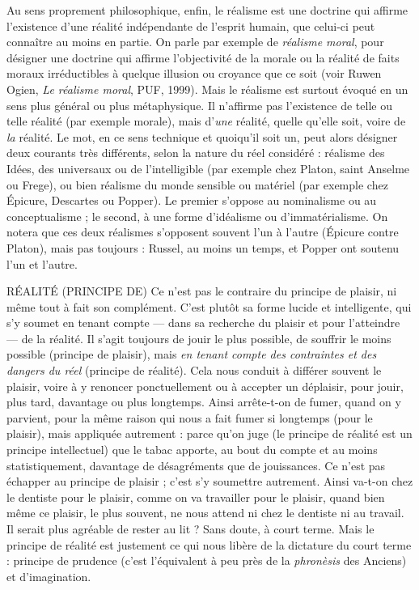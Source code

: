 Au sens proprement philosophique, enfin, le réalisme est une doctrine qui
affirme l'existence d’une réalité indépendante de l’esprit humain, que celui-ci
peut connaître au moins en partie. On parle par exemple de {\it réalisme moral},
pour désigner une doctrine qui affirme l’objectivité de la morale ou la réalité de
faits moraux irréductibles à quelque illusion ou croyance que ce soit (voir
Ruwen Ogien, {\it Le réalisme moral}, PUF, 1999). Mais le réalisme est surtout
évoqué en un sens plus général ou plus métaphysique. Il n’affirme pas l’existence
de telle ou telle réalité (par exemple morale), mais d’{\it une} réalité, quelle
qu’elle soit, voire de {\it la} réalité. Le mot, en ce sens technique et quoiqu'il soit un,
peut alors désigner deux courants très différents, selon la nature du réel
considéré : réalisme des Idées, des universaux ou de l’intelligible (par exemple
chez Platon, saint Anselme ou Frege), ou bien réalisme du monde sensible ou
matériel (par exemple chez Épicure, Descartes ou Popper). Le premier s'oppose
au nominalisme ou au conceptualisme ; le second, à une forme d’idéalisme ou
d’immatérialisme. On notera que ces deux réalismes s’opposent souvent l’un à
l’autre (Épicure contre Platon), mais pas toujours : Russel, au moins un temps,
et Popper ont soutenu l’un et l’autre.

RÉALITÉ (PRINCIPE DE) Ce n’est pas le contraire du principe de plaisir,
ni même tout à fait son complément. C’est
plutôt sa forme lucide et intelligente, qui s’y soumet en tenant compte — dans
sa recherche du plaisir et pour l’atteindre — de la réalité. Il s’agit toujours de
jouir le plus possible, de souffrir le moins possible (principe de plaisir), mais {\it en
tenant compte des contraintes et des dangers du réel} (principe de réalité). Cela
nous conduit à différer souvent le plaisir, voire à y renoncer ponctuellement ou
à accepter un déplaisir, pour jouir, plus tard, davantage ou plus longtemps.
Ainsi arrête-t-on de fumer, quand on y parvient, pour la même raison qui nous
a fait fumer si longtemps (pour le plaisir), mais appliquée autrement : parce
qu'on juge (le principe de réalité est un principe intellectuel) que le tabac
apporte, au bout du compte et au moins statistiquement, davantage de désagréments
que de jouissances. Ce n’est pas échapper au principe de plaisir ; c’est s’y
soumettre autrement. Ainsi va-t-on chez le dentiste pour le plaisir, comme on
va travailler pour le plaisir, quand bien même ce plaisir, le plus souvent, ne
nous attend ni chez le dentiste ni au travail. Il serait plus agréable de rester au
lit ? Sans doute, à court terme. Mais le principe de réalité est justement ce qui
nous libère de la dictature du court terme : principe de prudence (c’est l’équivalent
à peu près de la {\it phronèsis} des Anciens) et d'imagination.

